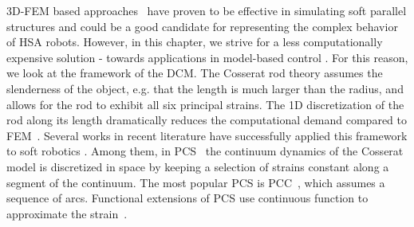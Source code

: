 3D-\gls{FEM} based approaches~\citep{farrell2020extension} have proven to be effective in simulating soft parallel structures \citep{vanneste2021enabling} and could be a good candidate for representing the complex behavior of \gls{HSA} robots. However, in this chapter, we strive for a less computationally expensive solution - towards applications in model-based control \citep{della2023model}. For this reason, we look at the framework of the \gls{DCM}. The Cosserat rod theory assumes the slenderness of the object, e.g. that the length is much larger than the radius, and allows for the rod to exhibit all six principal strains. The 1D discretization of the rod along its length dramatically reduces the computational demand compared to \gls{FEM}~\citep{gazzola2018forward}. 
%
Several works in recent literature have successfully applied this framework to soft robotics \citep{grazioso2019geometrically,sadati2021tmtdyn,armanini2023soft}. Among them, in \gls{PCS}~\citep{renda2018discrete} the continuum dynamics of the Cosserat model is discretized in space by keeping a selection of strains constant along a segment of the continuum. %
The most popular \gls{PCS} is \gls{PCC}~\citep{webster2010design}, which assumes a sequence of arcs. Functional extensions of \gls{PCS} use continuous function to approximate the strain~\citep{della2019control,renda2020geometric}. %

